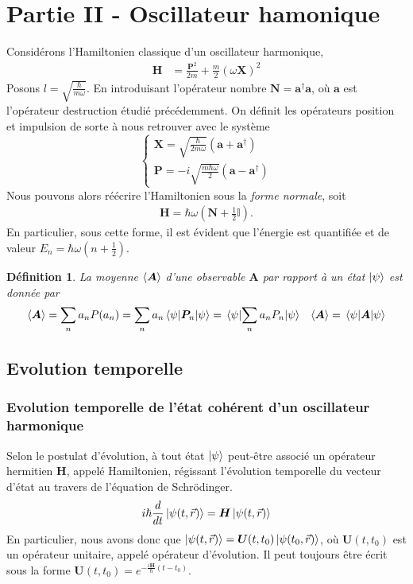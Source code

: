 \documentclass[11pt,oneside,a4paper]{article}
\newcommand{\h}{\ensuremath{\hbar}}
\newtheorem{definition}[theorem]{Définition}
\begin{document}
\section{Partie II - Oscillateur hamonique}
\label{part 2}
Considérons l'Hamiltonien classique d'un oscillateur harmonique, 
\begin{align}
  \label{Hamiltonien OH}
  \bm{H} &= \frac{\bm{P}^2}{2m} + \frac{m}{2}\left(\omega \bm{X}\right)^2
\end{align}
Posons $l = \sqrt{\frac{\h}{m\omega}}$. En introduisant l'opérateur nombre $\bm{N} = \bm{a}^\dagger \bm{a}$, où $\bm{a}$ est l'opérateur destruction étudié précédemment. On définit les opérateurs position et impulsion de sorte à nous retrouver avec le système
\begin{equation}
  \begin{cases}
    \bm{X} = \sqrt{\frac{\h}{2m\omega}}\left(\bm{a}+\bm{a}^\dagger\right)\\
    \bm{P} = -i\sqrt{\frac{m\h\omega}{2}}\left(\bm{a}-\bm{a}^\dagger\right)
  \end{cases}
  \label{P and X}
\end{equation}
Nous pouvons alors réécrire l'Hamiltonien sous la \emph{forme normale}, soit 
\begin{align}
  \label{Hamiltonien OH normale}
  \bm{H} = \h\omega\left(\bm{N}+\frac{1}{2}\mathbb{I}\right).
\end{align}
En particulier, sous cette forme, il est évident que l'énergie est quantifiée et de valeur $E_n = \h\omega\left(n+\frac{1}{2}\right)$.

\begin{definition}
  La moyenne $\expval{\bm{A}}$ d'une observable $\bm{A}$ par rapport à un état $\ket{\psi}$ est donnée par
  \begin{align*}
    \expval{\bm{A}} &= \sum_n a_nP(a_n) = \sum_n a_n \expval{\bm{P}_n}{\psi} = \expval{\sum_n a_nP_n}{\psi} &\expval{\bm{A}} = \expval{\bm{A}}{\psi} 
  \end{align*}
\end{definition}

\subsection{Evolution temporelle}
\subsubsection{Evolution temporelle de l'état cohérent d'un oscillateur harmonique}
Selon le postulat d'évolution, à tout état $\ket{\psi}$ peut-être associé un opérateur hermitien $\bm{H}$, appelé Hamiltonien, régissant l'évolution temporelle du vecteur d'état au travers de l'équation de Schrödinger.
\begin{equation*}
  i\h\frac{d}{dt}\ket{\psi(t,\vec{r})} = \bm{H}\ket{\psi (t,\vec{r})}
\end{equation*}
En particulier, nous avons donc que $\ket{\psi(t,\vec{r})} = \bm{U}(t,t_0)\ket{\psi(t_0,\vec{r})}$, où $\bm{U}(t,t_0)$ est un opérateur unitaire, appelé opérateur d'évolution. Il peut toujours être écrit sous la forme $\bm{U}(t,t_0) = e^{-\frac{i\bm{H}}{\h}(t-t_0)}$.\\
\end{document}
